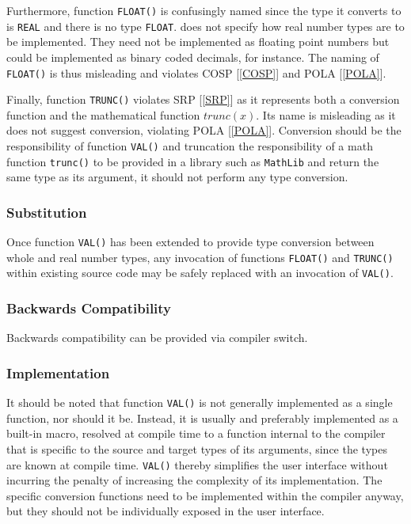 \documentclass[10pt,a4paper]{article}
\begin{document}
Furthermore, function \verb|FLOAT()| is confusingly named since the type it
converts to is \verb|REAL| and there is no type \verb|FLOAT|. \cite{Wirth88}
does not specify how real number types are to be implemented. They need not be
implemented as floating point numbers but could be implemented as binary coded
decimals, for instance. The naming of \verb|FLOAT()| is thus
misleading and violates COSP [\ref{COSP}] and POLA [\ref{POLA}].

Finally, function \verb|TRUNC()| violates SRP [\ref{SRP}] as it represents
both a conversion function and the mathematical function $trunc(x)$.
Its name is misleading as it does not suggest conversion, violating
POLA [\ref{POLA}]. Conversion should be the responsibility of function
\verb|VAL()| and truncation the responsibility of a math function
\verb|trunc()| to be provided in a library such as \verb|MathLib| and
return the same type as its argument, it should not perform any type
conversion.

\subsubsection{Substitution}

Once function \verb|VAL()| has been extended to provide type conversion
between whole and real number types, any invocation of functions \verb|FLOAT()| and \verb|TRUNC()| within existing source code may be safely
replaced with an invocation of \verb|VAL()|.

\subsubsection{Backwards Compatibility}

Backwards compatibility can be provided via compiler switch.

\subsubsection{Implementation}
It should be noted that function \verb|VAL()| is not generally implemented as a
single function, nor should it be. Instead, it is usually and preferably
implemented as a built-in macro, resolved at compile time to a function
internal to the compiler that is specific to the source and target types of its
arguments, since the types are known at compile time. \verb|VAL()| thereby
simplifies the user interface without incurring the penalty of increasing the
complexity of its implementation. The specific conversion functions need to be
implemented within the compiler anyway, but they should not be individually
exposed in the user interface.
\end{document}
